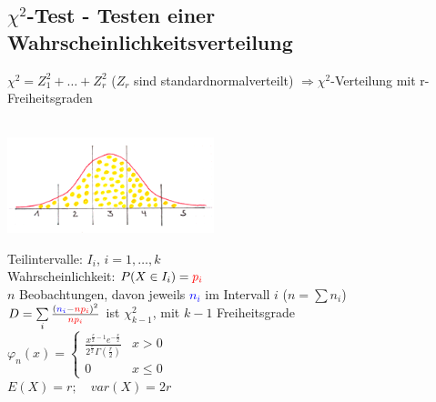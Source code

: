 	\subsection{$\chi^2$-Test - Testen einer Wahrscheinlichkeitsverteilung
	 }
		$\chi ^2 = Z_1^2+\ldots+Z_r^2$ ($Z_r$ sind standardnormalverteilt) $\Longrightarrow
		\chi^2$-Verteilung mit r-Freiheitsgraden\\ \\
		\begin{minipage}{6.5cm}
        \includegraphics[width=6cm]{./bilder/chi_quadrat.png}\\
        \end{minipage}
		\begin{minipage}{12cm}
        Teilintervalle: $I_i$, $i=1,\ldots,k$\\
        Wahrscheinlichkeit: $P(X\in I_i)=\textcolor{red}{p_i}$\\
        $n$ Beobachtungen, davon jeweils \textcolor{blue}{$n_i$} im Intervall
        $i$ ($n=\sum n_i$)\\
        $D=\sum\limits_i\frac{(\textcolor{blue}{n_i}-\textcolor{red}{np_i})^2}{\textcolor{red}{np_i}}$
        \hspace{8mm} ist $\chi^2_{k-1}$, mit $k-1$ Freiheitsgrade\\
        $\varphi_n(x)=  \begin{cases}\displaystyle \frac{x^{\frac{r}{2}-1}e^{
        -\frac{x}{2}}}{2^{\frac{r}{2}}\Gamma\left(\frac{r}{2}\right)} & x>0 \\
        0 & x\leq 0 \end{cases} $\\  
		$E(X)=r; \quad var(X)=2r$
        \end{minipage}
		
